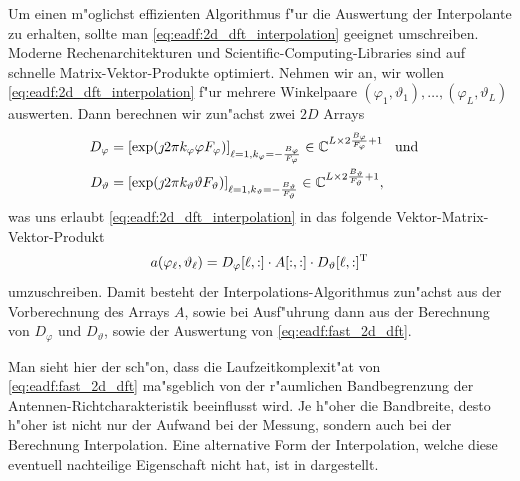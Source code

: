 Um einen m"oglichst effizienten Algorithmus f"ur die Auswertung der Interpolante zu erhalten, sollte man \eqref{eq:eadf:2d_dft_interpolation} geeignet umschreiben.
Moderne Rechenarchitekturen und Scientific-Computing-Libraries sind auf schnelle Matrix-Vektor-Produkte optimiert.
Nehmen wir an, wir wollen \eqref{eq:eadf:2d_dft_interpolation} f"ur mehrere Winkelpaare $(\varphi_1, \vartheta_1), \dots, (\varphi_L, \vartheta_L)$ auswerten.
Dann berechnen wir zun"achst zwei $2D$ Arrays
\begin{align}
    D_\varphi &= [\exp(\jmath 2 \pi k_\varphi \varphi F_\varphi)]_{\ell = 1, k_\varphi=-\frac{B_\varphi}{F_\varphi}} \in \mathbb{C}^{L \times 2 \frac{B_\varphi}{F_\varphi} + 1} {\hspace{3mm} \text{und} \hspace{3mm}}\\
    D_\vartheta &= [\exp(\jmath 2 \pi k_\vartheta \vartheta F_\vartheta)]_{\ell = 1, k_\vartheta=-\frac{B_\vartheta}{F_\vartheta}} \in \mathbb{C}^{L \times 2 \frac{B_\vartheta}{F_\vartheta} + 1}, 
\end{align}
was uns erlaubt \eqref{eq:eadf:2d_dft_interpolation} in das folgende Vektor-Matrix-Vektor-Produkt
\begin{equation}\label{eq:eadf:fast_2d_dft}
    a(\varphi_\ell, \vartheta_\ell) = 
        D_\varphi[\ell, :] \cdot A[:,:] \cdot D_\vartheta[\ell, :]^{\mathrm{T}}
\end{equation}
umzuschreiben.
Damit besteht der Interpolations-Algorithmus zun"achst aus der Vorberechnung des Arrays $A$, sowie bei Ausf"uhrung dann aus der Berechnung von $D_\varphi$ und $D_\vartheta$, sowie der Auswertung von \eqref{eq:eadf:fast_2d_dft}.

Man sieht hier der sch"on, dass die Laufzeitkomplexit"at von \eqref{eq:eadf:fast_2d_dft} ma"sgeblich von der r"aumlichen Bandbegrenzung der Antennen-Richtcharakteristik beeinflusst wird.
Je h"oher die Bandbreite, desto h"oher ist nicht nur der Aufwand bei der Messung, sondern auch bei der Berechnung Interpolation.
Eine alternative Form der Interpolation, welche diese eventuell nachteilige Eigenschaft nicht hat, ist in  dargestellt.
